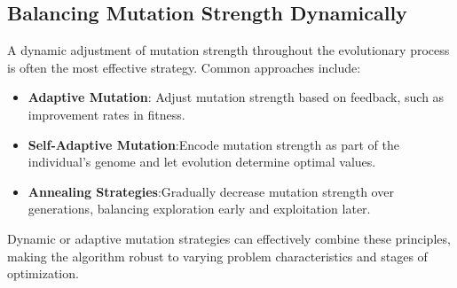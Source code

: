 \documentclass[12pt,letterpaper]{article}
\begin{document}
\subsection*{Balancing Mutation Strength Dynamically}
A dynamic adjustment of mutation strength throughout the evolutionary process is often the most effective strategy. Common approaches include:
\begin{itemize}
    \item \textbf{Adaptive Mutation}: Adjust mutation strength based on feedback, such as improvement rates in fitness.
    \item \textbf{Self-Adaptive Mutation}:Encode mutation strength as part of the individual's genome and let evolution determine optimal values.
    \item \textbf{Annealing Strategies}:Gradually decrease mutation strength over generations, balancing exploration early and exploitation later.
\end{itemize}

Dynamic or adaptive mutation strategies can effectively combine these principles, making the algorithm robust to varying problem characteristics and stages of optimization.
\end{document}
